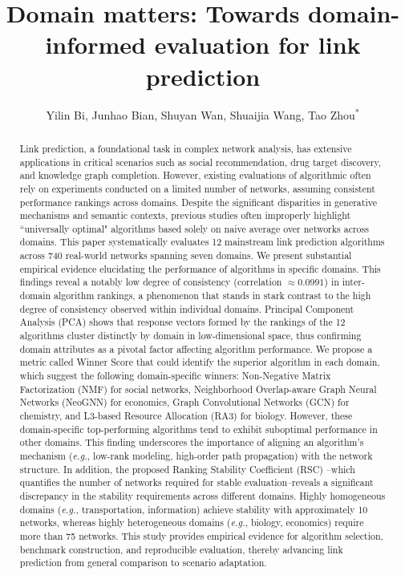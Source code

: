 \documentclass{article}
\begin{document}
	\title{Domain matters: Towards domain-informed evaluation for link prediction}
	\author{Yilin Bi, Junhao Bian, Shuyan Wan, Shuaijia Wang, Tao Zhou$^{*}$}
	\maketitle


\begin{abstract}
Link prediction, a foundational task in complex network analysis, has extensive applications in critical scenarios such as social recommendation, drug target discovery, and knowledge graph completion. However, existing evaluations of algorithmic often rely on experiments conducted on a limited number of networks, assuming consistent performance rankings across domains. Despite the significant disparities in generative mechanisms and semantic contexts, previous studies often improperly highlight ``universally optimal" algorithms based solely on naive average over networks across domains. This paper systematically evaluates 12 mainstream link prediction algorithms across 740 real-world networks spanning seven domains. We present substantial empirical evidence elucidating the performance of algorithms in specific domains. This findings reveal a notably low degree of consistency (correlation $\approx 0.0991$) in inter-domain algorithm rankings, a phenomenon that stands in stark contrast to the high degree of consistency observed within individual domains. Principal Component Analysis (PCA) shows that response vectors formed by the rankings of the 12 algorithms cluster distinctly by domain in low-dimensional space, thus confirming domain attributes as a pivotal factor affecting algorithm performance. We propose a metric called Winner Score that could identify the superior algorithm in each domain, which suggest the following domain-specific winners: Non-Negative Matrix Factorization (NMF) for social networks, Neighborhood Overlap-aware Graph Neural Networks (NeoGNN) for economics, Graph Convolutional Networks (GCN) for chemistry, and L3-based Resource Allocation (RA3) for biology. However, these domain-specific top-performing algorithms tend to exhibit suboptimal performance in other domains. This finding underscores the importance of aligning an algorithm's mechanism (\textit{e.g.}, low-rank modeling, high-order path propagation) with the network structure. In addition, the proposed Ranking Stability Coefficient (RSC) --which quantifies the number of networks required for stable evaluation--reveals a significant discrepancy in the stability requirements across different domains. Highly homogeneous domains (\textit{e.g.}, transportation, information) achieve stability with approximately 10 networks, whereas highly heterogeneous domains (\textit{e.g.}, biology, economics) require more than 75 networks. This study provides empirical evidence for algorithm selection, benchmark construction, and reproducible evaluation, thereby advancing link prediction from general comparison to scenario adaptation.
\end{abstract}
\end{document}
